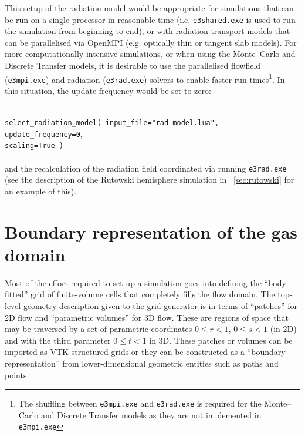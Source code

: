 This setup of the radiation model would be appropriate for simulations that can be run on a single processor in reasonable time (i.e. \texttt{e3shared.exe} is used to run the simulation from beginning to end), or with radiation transport models that can be parallelised via OpenMPI (e.g. optically thin or tangent slab models).
For more computationally intensive simulations, or when using the Monte--Carlo and Discrete Transfer models, it is desirable  to use the parallelised flowfield (\texttt{e3mpi.exe}) and radiation (\texttt{e3rad.exe}) solvers to enable faster run times\footnote{The shuffling between \texttt{e3mpi.exe} and \texttt{e3rad.exe} is required for the Monte--Carlo and Discrete Transfer models as they are not implemented in \texttt{e3mpi.exe}}.
In this situation, the update frequency would be set to zero:

\noindent\topbar\\
\texttt{select\_radiation\_model( input\_file="rad-model.lua", update\_frequency=0},\\
 \texttt{scaling=True )} 
 \\
\bottombar\\

 and the recalculation of the radiation field coordinated via running  \texttt{e3rad.exe} (see the description of the Rutowski hemisphere simulation in \textsection~\ref{sec:rutowski}  for an example of this).

\newpage
\section{Boundary representation of the gas domain}
%
Most of the effort required to set up a simulation goes into defining the
``body-fitted'' grid of finite-volume cells that completely fills the flow
domain.
The top-level geometry description given to the grid generator is in terms of
``patches'' for 2D flow and ``parametric volumes'' for 3D flow.
These are regions of space that may be traversed by
a set of parametric coordinates $0 \le r < 1$, $0 \le s < 1$ (in 2D) and 
with the third parameter $0 \le t < 1$ in 3D.
These patches or volumes can be imported as VTK structured grids or they can be
constructed as a ``boundary representation'' from lower-dimensional 
geometric entities such as paths and points.

